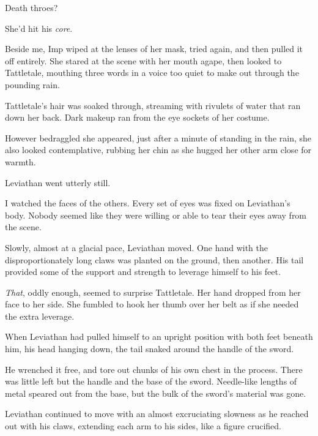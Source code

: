 Death throes?



She'd hit his \emph{core}.



Beside me, Imp wiped at the lenses of her mask, tried again, and then pulled it off entirely.  She stared at the scene with her mouth agape, then looked to Tattletale, mouthing three words in a voice too quiet to make out through the pounding rain.



Tattletale's hair was soaked through, streaming with rivulets of water that ran down her back.  Dark makeup ran from the eye sockets of her costume.



However bedraggled she appeared, just after a minute of standing in the rain, she also looked contemplative, rubbing her chin as she hugged her other arm close for warmth.



Leviathan went utterly still.



I watched the faces of the others.  Every set of eyes was fixed on Leviathan's body.  Nobody seemed like they were willing or able to tear their eyes away from the scene.



Slowly, almost at a glacial pace, Leviathan moved.  One hand with the disproportionately long claws was planted on the ground, then another.  His tail provided some of the support and strength to leverage himself to his feet.



\emph{That}, oddly enough, seemed to surprise Tattletale.  Her hand dropped from her face to her side.  She fumbled to hook her thumb over her belt as if she needed the extra leverage.



When Leviathan had pulled himself to an upright position with both feet beneath him, his head hanging down, the tail snaked around the handle of the sword.



He wrenched it free, and tore out chunks of his own chest in the process.  There was little left but the handle and the base of the sword.  Needle-like lengths of metal speared out from the base, but the bulk of the sword's material was gone.



Leviathan continued to move with an almost excruciating slowness as he reached out with his claws, extending each arm to his sides, like a figure crucified.



